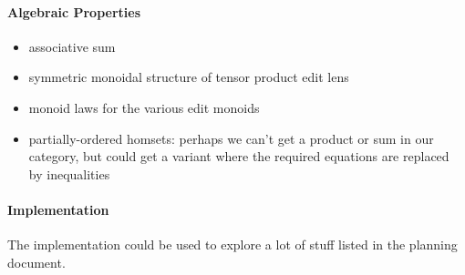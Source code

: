 \paragraph*{Algebraic Properties}
\begin{itemize}
    \item associative sum
    \item symmetric monoidal structure of tensor product edit lens
    \item monoid laws for the various edit monoids
    \item partially-ordered homsets: perhaps we can't get a product or sum
        in our category, but could get a variant where the required
        equations are replaced by inequalities
\end{itemize}

\paragraph*{Implementation}
The implementation could be used to explore a lot of stuff listed in the
planning document.

